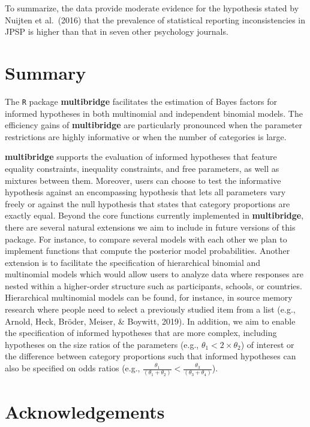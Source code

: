 \documentclass[
  english,
  man,floatsintext]{apa6}
\begin{document}
To summarize, the data provide moderate evidence for the hypothesis stated by Nuijten et al.~(2016) that the prevalence of statistical reporting inconsistencies in JPSP is higher than that in seven other psychology journals.

\hypertarget{summary}{%
\section{Summary}\label{summary}}

The \texttt{R} package \textbf{multibridge} facilitates the estimation of Bayes factors for informed hypotheses in both multinomial and independent binomial models. The efficiency gains of \textbf{multibridge} are particularly pronounced when the parameter restrictions are highly informative or when the number of categories is large.

\textbf{multibridge} supports the evaluation of informed hypotheses that feature equality constraints, inequality constraints, and free parameters, as well as mixtures between them. Moreover, users can choose to test the informative hypothesis against an encompassing hypothesis that lets all parameters vary freely or against the null hypothesis that states that category proportions are exactly equal. Beyond the core functions currently implemented in \textbf{multibridge}, there are several natural extensions we aim to include in future versions of this package. For instance, to compare several models with each other we plan to implement functions that compute the posterior model probabilities. Another extension is to facilitate the specification of hierarchical binomial and multinomial models which would allow users to analyze data where responses are nested within a higher-order structure such as participants, schools, or countries. Hierarchical multinomial models can be found, for instance, in source memory research where people need to select a previously studied item from a list (e.g., Arnold, Heck, Bröder, Meiser, \& Boywitt, 2019). In addition, we aim to enable the specification of informed hypotheses that are more complex, including hypotheses on the size ratios of the parameters (e.g., \(\theta_1 < 2 \times \theta_2\)) of interest or the difference between category proportions such that informed hypotheses can also be specified on odds ratios (e.g., \(\frac{\theta_1}{(\theta_1 + \theta_2)} < \frac{\theta_3}{(\theta_3 + \theta_4)}\)).

\hypertarget{acknowledgements}{%
\section{Acknowledgements}\label{acknowledgements}}
\end{document}
